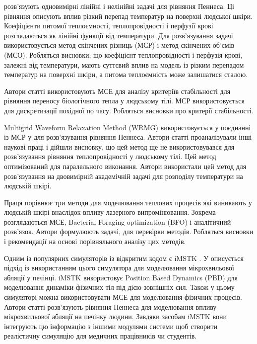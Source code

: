 \cite{ostadhossein2023bioheat} розв'язують одновимірні лінійні і нелінійні задачі для рівняння Пеннеса. Ці рівняння
описують вплив різкий перепад температур на поверхні людської шкіри. Коефіцієнти питомої теплоємності, теплопровідності
і перфузії крові розглядаються як лінійні функції від температури. Для розв'язування задачі використовується метод
скінчених різниць (МСР) і метод скінчених об'ємів (МСО). Робляться висновки, що коефіцієнт теплопровідності і перфузія
крові, залежні від температури, мають суттєвий вплив на модель із різким перепадом температур на поверхні шкіри, а
питома теплоємність може залишатися сталою.

Автори статті \cite{gangadhara2024stability} використовують МСЕ для аналізу критеріїв стабільності для рівняння переносу
біологічного тепла у людському тілі. МСР використовується для дискретизації похідної по часу. Робляться висновки про 
критерії стабільності. 

Multigrid Waveform Relaxation Method (WRMG) використовується у поєднанні із МСР у \cite{santiago2023multigrid} для 
розв'язування рівняння Пеннеса. Автори статті проаналізували інші наукові праці і дійшли висновку, що цей метод ще не 
використовувався для розв'язування рівняння теплопровідності у людському тілі. Цей метод оптимізований для паралельного 
виконання. Автори використали цей метод для розв'язування на двовимірній академічній задачі для розподілу температури на
людській шкірі.

Праця \cite{munshid2025laser} порівнює три методи для моделювання теплових процесів які виникають у людській шкірі
внаслідок впливу лазерного випромінювання. Зокрема розглядаються МСЕ, Bacterial Foraging optimization (BFO) і
аналітичний розв'язок. Автори формулюють задачі, для перевірки методів. Робляться висновки і рекомендації на основі
порівняльного аналізу цих методів.

Одним із популярних симуляторів із відкритим кодом є iMSTK \cite{imstk_reference}. У \cite{imstk_ablation_liver} 
описується підхід із використанням цього симулятора для моделювання мікрохвильової абляції у печінці. iMSTK використовує
Position Based Dynamics (PBD) для моделювання динаміки фізичних тіл під дією зовнішніх сил. Також у цьому симуляторі 
можна використовувати МСЕ для моделювання фізичних процесів. Автори статті розв'язують рівняння Пеннеса для моделювання
впливу мікрохвильової абляції на печінку людини. Завдяки засобам iMSTK вони інтегрують цю інформацію з іншими модулями
системи щоб створити реалістичну симуляцію для медичних працівників чи студентів. 

